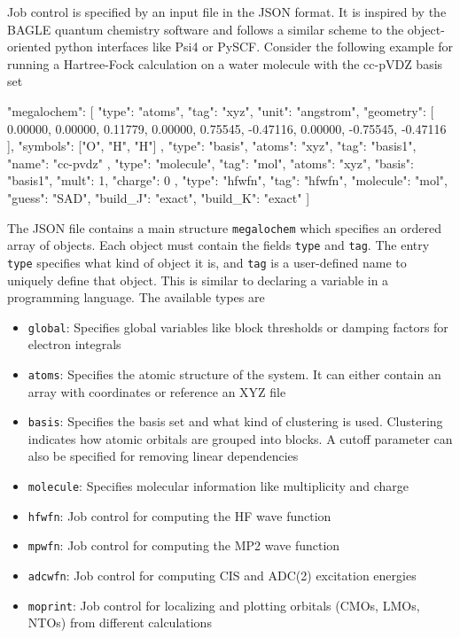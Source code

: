 Job control is specified by an input file in the JSON format. It is inspired by the BAGLE quantum chemistry software \cite{Shi2018} and follows a similar scheme to the object-oriented python interfaces like Psi4 or PySCF. Consider the following example for running a Hartree-Fock calculation on a water molecule with the cc-pVDZ basis set
\begin{code}
{
  "megalochem": [
  {
    "type": "atoms",
    "tag": "xyz",
    "unit": "angstrom",
    "geometry": [
      0.00000,        0.00000,        0.11779,
      0.00000,        0.75545,       -0.47116,
      0.00000,       -0.75545,       -0.47116
    ],
    "symbols": ["O", "H", "H"]
  },
  {
    "type": "basis",
    "atoms": "xyz",
    "tag": "basis1",
    "name": "cc-pvdz"
  },
  {
    "type": "molecule",
    "tag": "mol",
    "atoms": "xyz",
    "basis": "basis1",
    "mult": 1,
    "charge": 0
  },
  {
    "type": "hfwfn",
    "tag": "hfwfn",
    "molecule": "mol",
    "guess": "SAD",
    "build_J": "exact",
    "build_K": "exact"
   }]
}
\end{code}  
\noindent The JSON file contains a main structure \texttt{megalochem} which specifies an ordered array of objects. Each object must contain the fields \texttt{type} and  \texttt{tag}. The entry \texttt{type} specifies what kind of object it is, and \texttt{tag} is a user-defined name to uniquely define that object. This is similar to declaring a variable in a programming language. The available types are
\begin{itemize}
\item \texttt{global}: Specifies global variables like block thresholds or damping factors for electron integrals

\item \texttt{atoms}: Specifies the atomic structure of the system. It can either contain an array with coordinates or reference an XYZ file

\item \texttt{basis}: Specifies the basis set and what kind of clustering is used. Clustering indicates how atomic orbitals are grouped into blocks. A cutoff parameter can also be specified for removing linear dependencies

\item \texttt{molecule}: Specifies molecular information like multiplicity and charge

\item \texttt{hfwfn}: Job control for computing the HF wave function

\item \texttt{mpwfn}: Job control for computing the MP2 wave function

\item \texttt{adcwfn}: Job control for computing CIS and ADC(2) excitation energies

\item \texttt{moprint}: Job control for localizing and plotting orbitals (CMOs, LMOs, NTOs) from different calculations

\end{itemize} 

